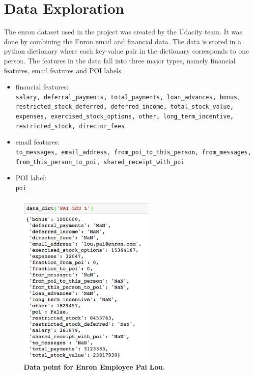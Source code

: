 \documentclass[twoside,openright,titlepage,numbers=noenddot,headinclude,%
               footinclude=true,cleardoublepage=empty,abstractoff,BCOR=5mm,%
               paper=a4,fontsize=11pt,ngerman,american]{scrreprt}
\numberwithin{theorem}{chapter}
\numberwithin{definition}{chapter}
\numberwithin{algorithm}{chapter}
\numberwithin{figure}{chapter}
\numberwithin{table}{chapter}
\numberwithin{equation}{chapter}
\begin{document}
\section*{Data Exploration}

The enron dataset used in the project was created by the Udacity team. It was done by combining the Enron email and financial data. The data is stored in a python dictionary where each key-value pair in the dictionary corresponds to one person. The features in the data fall into three major types, namely financial features, email features and POI labels.

\begin{itemize}%
\item financial features:\\ \texttt{salary, deferral\_payments, total\_payments, loan\_advances, bonus, restricted\_stock\_deferred, deferred\_income, total\_stock\_value, expenses, exercised\_stock\_options, other, long\_term\_incentive, restricted\_stock, director\_fees}

\item email features:\\ \texttt{to\_messages, email\_address, from\_poi\_to\_this\_person, from\_messages, from\_this\_person\_to\_poi, shared\_receipt\_with\_poi}

\item POI label:\\ \texttt{poi}
\end{itemize}

\begin{figure}[!hbtp]
\centering
    \includegraphics[width=0.6\textwidth]{figures/pailou}
    
    \caption{\textbf{Data point for Enron Employee Pai Lou.}}
\end{figure}
\end{document}
